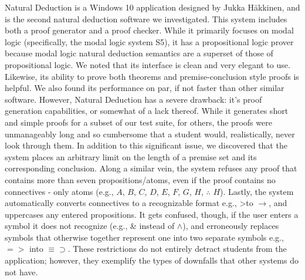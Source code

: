 \documentclass[ms]{uncgdissertationexp2}
\theoremstyle{plain}
\theoremstyle{definition}
\theoremstyle{remark}
\begin{document}
Natural Deduction is a Windows 10 application designed by Jukka H\"akkinen, and is the second natural deduction software we investigated. This system includes both a proof generator and a proof checker. While it primarily focuses on modal logic (specifically, the modal logic system S5), it has a propositional logic prover because modal logic natural deduction semantics are a superset of those of propositional logic. We noted that its interface is clean and very elegant to use. Likewise, its ability to prove both theorems and premise-conclusion style proofs is helpful. We also found its performance on par, if not faster than other similar software. However, Natural Deduction has a severe drawback: it's proof generation capabilities, or somewhat of a lack thereof. While it generates short and simple proofs for a subset of our test suite, for others, the proofs were unmanageably long and so cumbersome that a student would, realistically, never look through them. In addition to this significant issue, we discovered that the system places an arbitrary limit on the length of a premise set and its corresponding conclusion. Along a similar vein, the system refuses any proof that contains more than seven propositions/atoms, even if the proof contains no connectives - only atoms (e.g., $A$, $B$, $C$, $D$, $E$, $F$, $G$, $H$, $\therefore$ $H$). Lastly, the system automatically converts connectives to a recognizable format e.g., \textgreater\;to $\to$, and uppercases any entered propositions. It gets confused, though, if the user enters a symbol it does not recognize (e.g., \& instead of $\land$), and erroneously replaces symbols that otherwise together represent one into two separate symbols e.g., $=>$ into $\equiv\supset$. These restrictions do not entirely detract students from the application; however, they exemplify the types of downfalls that other systems do not have.
\end{document}
